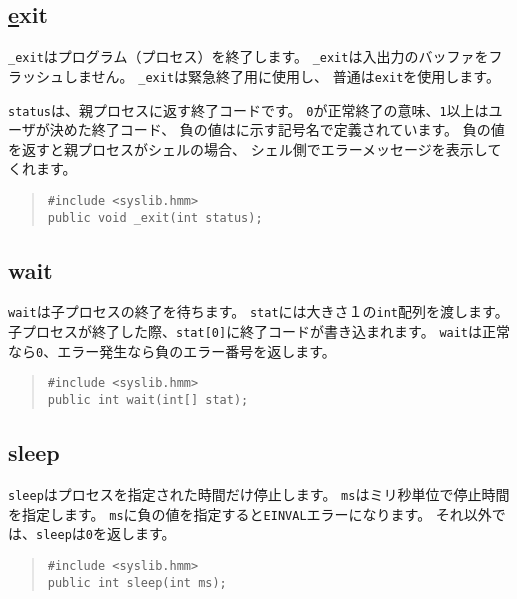 \subsection{\ul exit}

\verb/_exit/はプログラム（プロセス）を終了します。
\verb/_exit/は入出力のバッファをフラッシュしません。
\verb/_exit/は緊急終了用に使用し、
普通は\verb/exit/を使用します。

\verb/status/は、親プロセスに返す終了コードです。
\verb/0/が正常終了の意味、\verb/1/以上はユーザが決めた終了コード、
負の値はに示す記号名で定義されています。
負の値を返すと親プロセスがシェルの場合、
シェル側でエラーメッセージを表示してくれます。

\begin{quote}
\begin{verbatim}
#include <syslib.hmm>
public void _exit(int status);
\end{verbatim}
\end{quote}

\subsection{wait}

\verb/wait/は子プロセスの終了を待ちます。
\verb/stat/には大きさ１の\verb/int/配列を渡します。
子プロセスが終了した際、\verb/stat[0]/に終了コードが書き込まれます。
\verb/wait/は正常なら\verb/0/、エラー発生なら負のエラー番号を返します。

\begin{quote}
\begin{verbatim}
#include <syslib.hmm>
public int wait(int[] stat);
\end{verbatim}
\end{quote}

\subsection{sleep}

\verb/sleep/はプロセスを指定された時間だけ停止します。
\verb/ms/はミリ秒単位で停止時間を指定します。
\verb/ms/に負の値を指定すると\verb/EINVAL/エラーになります。
それ以外では、\verb/sleep/は\verb/0/を返します。

\begin{quote}
\begin{verbatim}
#include <syslib.hmm>
public int sleep(int ms);
\end{verbatim}
\end{quote}

